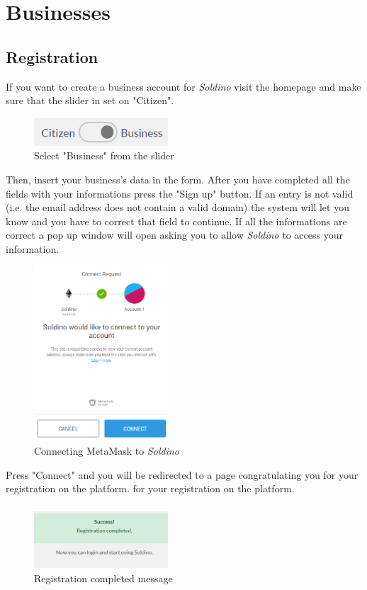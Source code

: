 \section{Businesses}
	\subsection{Registration}
	If you want to create a business account for \textit{Soldino} 
	visit the homepage and make sure that the slider in set on "Citizen".\\
	\begin{figure}[H]
		\includegraphics[width=5cm]{res/images/user_business.png}
		\centering
		\caption{Select "Business" from the slider}
	\end{figure}	
	\noindent Then, insert your business's data in the form. After you have completed 
	all the	fields with your informations press the "Sign up" button. If an 
	entry is not valid (i.e. the email address does not contain a valid 
	domain) the system will let you know and you have to correct that field 
	to continue. If all the informations are correct a pop up window will open 
	asking you to allow \textit{Soldino} to access your information.\\
	\begin{figure}[H]
		\includegraphics[width=5cm]{res/images/metamask_connect.png}
		\centering
		\caption{Connecting MetaMask to \textit{Soldino}}
	\end{figure}
	\noindent \noindent Press "Connect" and you will be redirected to a page 
	congratulating you for your registration on the platform.
	for your registration on the platform.
	\begin{figure}[H]
		\includegraphics[width=5cm]{res/images/registration_complete.png}
		\centering
		\caption{Registration completed message}
	\end{figure}
